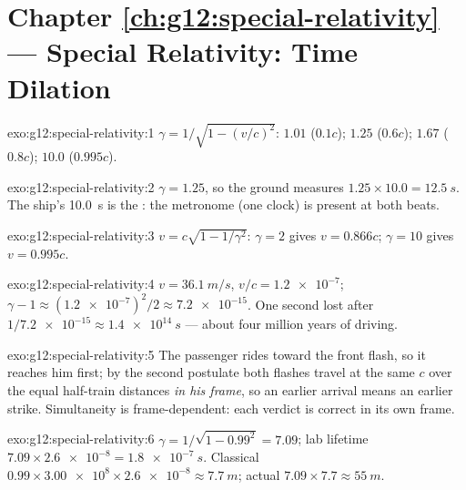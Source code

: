 \section*{Chapter \ref{ch:g12:special-relativity} --- Special Relativity: Time Dilation}

\begin{solution}{exo:g12:special-relativity:1}
$\gamma = 1/\sqrt{1 - (v/c)^2}$: $1.01$ ($0.1c$); $1.25$ ($0.6c$);
$1.67$ ($0.8c$); $10.0$ ($0.995c$).
\end{solution}

\begin{solution}{exo:g12:special-relativity:2}
$\gamma = 1.25$, so the ground measures $1.25 \times 10.0 =
\qty{12.5}{s}$. The ship's \qty{10.0}{s} is the : the
metronome (one clock) is present at both beats.
\end{solution}

\begin{solution}{exo:g12:special-relativity:3}
$v = c\sqrt{1 - 1/\gamma^2}$: $\gamma = 2$ gives $v = 0.866c$;
$\gamma = 10$ gives $v = 0.995c$.
\end{solution}

\begin{solution}{exo:g12:special-relativity:4}
$v = \qty{36.1}{m/s}$, $v/c = \num{1.2e-7}$;
$\gamma - 1 \approx (\num{1.2e-7})^2/2 \approx \num{7.2e-15}$. One
second lost after $1/\num{7.2e-15} \approx \qty{1.4e14}{s}$ --- about
four million years of driving.
\end{solution}

\begin{solution}{exo:g12:special-relativity:5}
The passenger rides toward the front flash, so it reaches him first;
by the second postulate both flashes travel at the same $c$ over the
equal half-train distances \emph{in his frame}, so an earlier arrival
means an earlier strike. Simultaneity is frame-dependent: each verdict
is correct in its own frame.
\end{solution}

\begin{solution}{exo:g12:special-relativity:6}
$\gamma = 1/\sqrt{1 - 0.99^2} = 7.09$; lab lifetime
$7.09 \times \num{2.6e-8} = \qty{1.8e-7}{s}$. Classical 
$0.99 \times \num{3.00e8} \times \num{2.6e-8} \approx \qty{7.7}{m}$;
actual $7.09 \times 7.7 \approx \qty{55}{m}$.
\end{solution}

